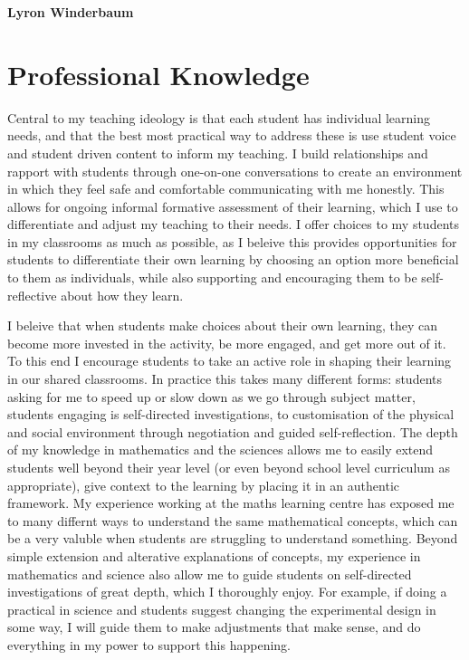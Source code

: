 \documentclass[a4paper,12pt]{report}
\begin{document}
 

\begin{center}
{\Large \textbf{Lyron Winderbaum}} \\ \vspace{4mm}
\end{center}

\section*{Professional Knowledge}

Central to my teaching ideology is that each student has individual learning needs, and that the best most practical way to address these is use student voice and student driven content to inform my teaching. I build relationships and rapport with students through one-on-one conversations to create an environment in which they feel safe and comfortable communicating with me honestly. This allows for ongoing informal formative assessment of their learning, which I use to differentiate and adjust my teaching to their needs. I offer choices to my students in my classrooms as much as possible, as I beleive this provides opportunities for students to differentiate their own learning by choosing an option more beneficial to them as individuals, while also supporting and encouraging them to be self-reflective about how they learn.

I beleive that when students make choices about their own learning, they can become more invested in the activity, be more engaged, and get more out of it. To this end I encourage students to take an active role in shaping their learning in our shared classrooms. In practice this takes many different forms: students asking for me to speed up or slow down as we go through subject matter, students engaging is self-directed investigations, to customisation of the physical and social environment through negotiation and guided self-reflection. The depth of my knowledge in mathematics and the sciences allows me to easily extend students well beyond their year level (or even beyond school level curriculum as appropriate), give context to the learning by placing it in an authentic framework. My experience working at the maths learning centre has exposed me to many differnt ways to understand the same mathematical concepts, which can be a very valuble when students are struggling to understand something. Beyond simple extension and alterative explanations of concepts, my experience in mathematics and science also allow me to guide students on self-directed investigations of great depth, which I thoroughly enjoy. For example, if doing a practical in science and students suggest changing the experimental design in some way, I will guide them to make adjustments that make sense, and do everything in my power to support this happening.
\end{document}
